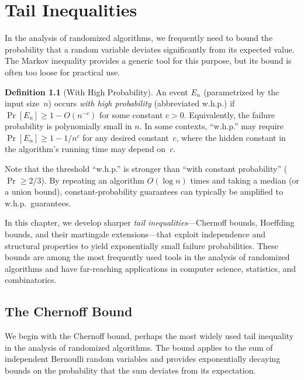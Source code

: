 \documentclass[twoside,12pt]{book}
\theoremstyle{plain}
\theoremstyle{definition}
\newtheorem{definition}[theorem]{Definition}
\theoremstyle{remark}
\begin{document}
\chapter{Tail Inequalities}
\label{ch:tail-inequalities}

In the analysis of randomized algorithms, we frequently need to bound the
probability that a random variable deviates significantly from its expected
value. The Markov inequality provides a generic tool for this purpose, but
its bound is often too loose for practical use.

\begin{definition}[With High Probability]
\label{def:whp}
An event $E_n$ (parametrized by the input size~$n$) occurs \emph{with high
probability} (abbreviated w.h.p.) if $\Pr[E_n] \ge 1 - O(n^{-c})$ for some
constant $c > 0$.  Equivalently, the failure probability is polynomially
small in $n$.  In some contexts, ``w.h.p.'' may require
$\Pr[E_n] \ge 1 - 1/n^c$ for any desired constant~$c$, where the hidden
constant in the algorithm's running time may depend on~$c$.
\end{definition}

Note that the threshold ``w.h.p.'' is stronger than ``with constant
probability'' ($\Pr \ge 2/3$).  By repeating an algorithm $O(\log n)$
times and taking a median (or a union bound), constant-probability
guarantees can typically be amplified to w.h.p.\ guarantees.

In this chapter, we develop
sharper \emph{tail inequalities}---Chernoff bounds, Hoeffding bounds, and
their martingale extensions---that exploit independence and structural
properties to yield exponentially small failure probabilities. These bounds
are among the most frequently used tools in the analysis of randomized
algorithms and have far-reaching applications in computer science,
statistics, and combinatorics.

\section{The Chernoff Bound}
\label{sec:chernoff}

We begin with the Chernoff bound, perhaps the most widely used tail
inequality in the analysis of randomized algorithms. The bound applies to
the sum of independent Bernoulli random variables and provides
exponentially decaying bounds on the probability that the sum deviates
from its expectation.
\end{document}
